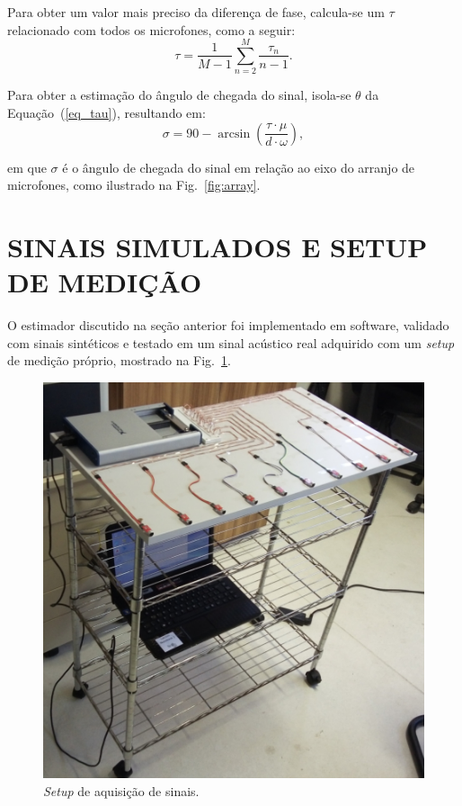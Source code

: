 \documentclass{sbrt2017port}
\begin{document}
Para obter um valor mais preciso da diferença de fase, calcula-se um $\tau$ relacionado com todos os microfones, como a seguir:
\begin{equation}\label{eq:media_tau}
\tau = \frac{1}{M-1}\sum_{n=2}^{M} \frac{\tau_n}{n-1}.
\end{equation}


Para obter a estimação do ângulo de chegada do sinal, isola-se $\theta$ da Equação~(\ref{eq_tau}), resultando em:
\begin{equation}
\sigma = 90-\arcsin \left(\frac{\tau \cdot \mu}{d \cdot \omega} \right ),
\end{equation} 
 
\noindent em que $\sigma$ é o ângulo de chegada do sinal em relação ao eixo do arranjo de microfones, como ilustrado na Fig.~\ref{fig:array}.
 

\section{SINAIS SIMULADOS E SETUP DE MEDIÇÃO}
\label{sec_gera_sinal}
O estimador discutido na seção anterior foi implementado em software, validado com sinais sintéticos e testado em um sinal acústico real adquirido com um \textit{setup} de medição próprio, mostrado na Fig.~\ref{fig:setup}.  
\begin{figure}[!htb]
    \centering
    \includegraphics[width=\columnwidth]{images/setup.jpg}
    \caption{\textit{Setup} de aquisição de sinais.}
    \label{fig:setup}
\end{figure}
\end{document}
